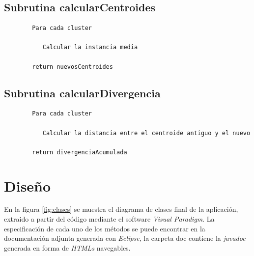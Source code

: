 \documentclass[a4paper]{report}
\begin{document}
	\section{Subrutina calcularCentroides}
	
		\begin{verbatim}
		Para cada cluster
		
		   Calcular la instancia media
		   
		return nuevosCentroides
		\end{verbatim}
	
	\section{Subrutina calcularDivergencia}
	
		\begin{verbatim}
		Para cada cluster 
		   
		   Calcular la distancia entre el centroide antiguo y el nuevo
		   
		return divergenciaAcumulada
		\end{verbatim}

\chapter{Diseño}

En la figura \ref{fig:clases} se muestra el diagrama de clases final de la aplicación, extraido a partir del código mediante el software \textit{Visual Paradigm}. La especificación de cada uno de los métodos se puede encontrar en la documentación adjunta generada con \textit{Eclipse}, la carpeta doc contiene la \textit{javadoc} generada en forma de \textit{HTMLs} navegables.
	
\end{document}
